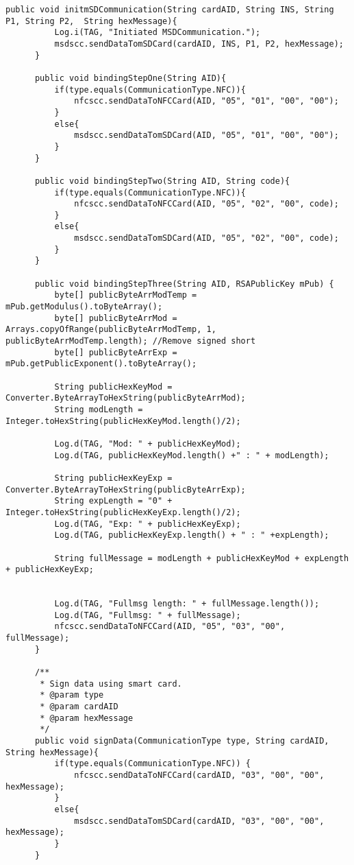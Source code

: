\begin{lstlisting}[caption=CommunicationController.java.,breaklines=true,breakatwhitespace=false, label=lst:CommunicationController,escapechar=å]
      public void initmSDCommunication(String cardAID, String INS, String P1, String P2,  String hexMessage){
          Log.i(TAG, "Initiated MSDCommunication.");
          msdscc.sendDataTomSDCard(cardAID, INS, P1, P2, hexMessage);
      }

      public void bindingStepOne(String AID){
          if(type.equals(CommunicationType.NFC)){
              nfcscc.sendDataToNFCCard(AID, "05", "01", "00", "00");
          }
          else{
              msdscc.sendDataTomSDCard(AID, "05", "01", "00", "00");
          }
      }

      public void bindingStepTwo(String AID, String code){
          if(type.equals(CommunicationType.NFC)){
              nfcscc.sendDataToNFCCard(AID, "05", "02", "00", code);
          }
          else{
              msdscc.sendDataTomSDCard(AID, "05", "02", "00", code);
          }
      }

      public void bindingStepThree(String AID, RSAPublicKey mPub) {
          byte[] publicByteArrModTemp = mPub.getModulus().toByteArray();
          byte[] publicByteArrMod = Arrays.copyOfRange(publicByteArrModTemp, 1, publicByteArrModTemp.length); //Remove signed short
          byte[] publicByteArrExp = mPub.getPublicExponent().toByteArray();

          String publicHexKeyMod = Converter.ByteArrayToHexString(publicByteArrMod);
          String modLength = Integer.toHexString(publicHexKeyMod.length()/2);

          Log.d(TAG, "Mod: " + publicHexKeyMod);
          Log.d(TAG, publicHexKeyMod.length() +" : " + modLength);

          String publicHexKeyExp = Converter.ByteArrayToHexString(publicByteArrExp);
          String expLength = "0" + Integer.toHexString(publicHexKeyExp.length()/2);
          Log.d(TAG, "Exp: " + publicHexKeyExp);
          Log.d(TAG, publicHexKeyExp.length() + " : " +expLength);

          String fullMessage = modLength + publicHexKeyMod + expLength + publicHexKeyExp;


          Log.d(TAG, "Fullmsg length: " + fullMessage.length());
          Log.d(TAG, "Fullmsg: " + fullMessage);
          nfcscc.sendDataToNFCCard(AID, "05", "03", "00", fullMessage);
      }

      /**
       * Sign data using smart card.
       * @param type
       * @param cardAID
       * @param hexMessage
       */
      public void signData(CommunicationType type, String cardAID, String hexMessage){
          if(type.equals(CommunicationType.NFC)) {
              nfcscc.sendDataToNFCCard(cardAID, "03", "00", "00", hexMessage);
          }
          else{
              msdscc.sendDataTomSDCard(cardAID, "03", "00", "00", hexMessage);
          }
      }


\end{lstlisting}
